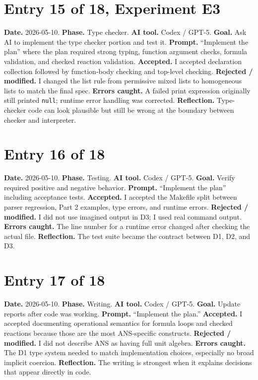 \documentclass[11pt,a4paper]{article}
\newcommand{\code}[1]{\texttt{#1}}
\begin{document}
\section*{Entry 15 of 18, Experiment E3}
\textbf{Date.} 2026-05-10.
\textbf{Phase.} Type checker.
\textbf{AI tool.} Codex / GPT-5.
\textbf{Goal.} Ask AI to implement the type checker portion and test it.
\textbf{Prompt.} ``Implement the plan'' where the plan required strong typing, function argument checks, formula validation, and checked reaction validation.
\textbf{Accepted.} I accepted declaration collection followed by function-body checking and top-level checking.
\textbf{Rejected / modified.} I changed the list rule from permissive mixed lists to homogeneous lists to match the final spec.
\textbf{Errors caught.} A failed print expression originally still printed \code{null}; runtime error handling was corrected.
\textbf{Reflection.} Type-checker code can look plausible but still be wrong at the boundary between checker and interpreter.

\section*{Entry 16 of 18}
\textbf{Date.} 2026-05-10.
\textbf{Phase.} Testing.
\textbf{AI tool.} Codex / GPT-5.
\textbf{Goal.} Verify required positive and negative behavior.
\textbf{Prompt.} ``Implement the plan'' including acceptance tests.
\textbf{Accepted.} I accepted the Makefile split between parser regression, Part 2 examples, type errors, and runtime errors.
\textbf{Rejected / modified.} I did not use imagined output in D3; I used real command output.
\textbf{Errors caught.} The line number for a runtime error changed after checking the actual file.
\textbf{Reflection.} The test suite became the contract between D1, D2, and D3.

\section*{Entry 17 of 18}
\textbf{Date.} 2026-05-10.
\textbf{Phase.} Writing.
\textbf{AI tool.} Codex / GPT-5.
\textbf{Goal.} Update reports after code was working.
\textbf{Prompt.} ``Implement the plan.''
\textbf{Accepted.} I accepted documenting operational semantics for formula loops and checked reactions because those are the most ANS-specific constructs.
\textbf{Rejected / modified.} I did not describe ANS as having full unit algebra.
\textbf{Errors caught.} The D1 type system needed to match implementation choices, especially no broad implicit coercion.
\textbf{Reflection.} The writing is strongest when it explains decisions that appear directly in code.
\end{document}
